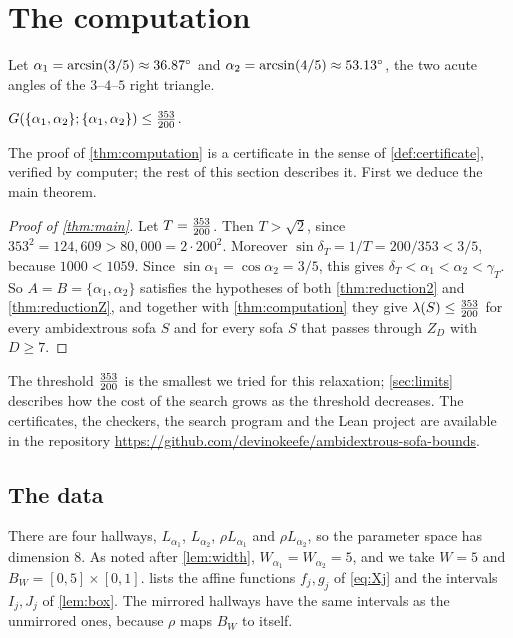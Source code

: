 \section{The computation}\label{sec:computation}

Let $\alpha_1=\arcsin(3/5)\approx36.87^{\circ}$ and $\alpha_2=\arcsin(4/5)\approx53.13^{\circ}$, the two acute angles of the $3$--$4$--$5$ right triangle.

\begin{thm}\label{thm:computation}
$G(\{\alpha_1,\alpha_2\};\{\alpha_1,\alpha_2\})\le\tfrac{353}{200}$.
\end{thm}

The proof of \cref{thm:computation} is a certificate in the sense of \cref{def:certificate}, verified by computer; the rest of this section describes it. First we deduce the main theorem.

\begin{proof}[Proof of \cref{thm:main}]
Let $T=\tfrac{353}{200}$. Then $T>\sqrt2$, since $353^2=124{,}609>80{,}000=2\cdot200^2$. Moreover $\sin\delta_T=1/T=200/353<3/5$, because $1000<1059$. Since $\sin\alpha_1=\cos\alpha_2=3/5$, this gives $\delta_T<\alpha_1<\alpha_2<\gamma_T$. So $A=B=\{\alpha_1,\alpha_2\}$ satisfies the hypotheses of both \cref{thm:reduction2} and \cref{thm:reductionZ}, and together with \cref{thm:computation} they give $\lambda(S)\le\tfrac{353}{200}$ for every ambidextrous sofa $S$ and for every sofa $S$ that passes through $Z_D$ with $D\ge7$.
\end{proof}

The threshold $\tfrac{353}{200}$ is the smallest we tried for this relaxation; \cref{sec:limits} describes how the cost of the search grows as the threshold decreases. The certificates, the checkers, the search program and the Lean project are available in the repository \url{https://github.com/devinokeefe/ambidextrous-sofa-bounds}.

\subsection{The data}

There are four hallways, $L_{\alpha_1}$, $L_{\alpha_2}$, $\rho L_{\alpha_1}$ and $\rho L_{\alpha_2}$, so the parameter space has dimension $8$. As noted after \cref{lem:width}, $W_{\alpha_1}=W_{\alpha_2}=5$, and we take $W=5$ and $B_W=[0,5]\times[0,1]$.  lists the affine functions $f_j,g_j$ of \eqref{eq:Xj} and the intervals $I_j,J_j$ of \cref{lem:box}. The mirrored hallways have the same intervals as the unmirrored ones, because $\rho$ maps $B_W$ to itself.

